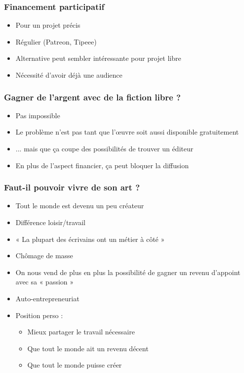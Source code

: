 \documentclass[11pt]{beamer}
\begin{document}
\begin{frame}
  \frametitle{Financement participatif}
    \begin{itemize}
    \item Pour un projet précis
    \item Régulier (Patreon, Tipeee)
    \item Alternative peut sembler intéressante pour projet libre
    \item Nécessité d'avoir déjà une audience
    \end{itemize}
\end{frame}

\begin{frame}
  \frametitle{Gagner de l'argent avec de la fiction libre ?}
    \begin{itemize}
    \item Pas impossible
    \item Le problème n'est pas tant que l'œuvre soit aussi disponible gratuitement
    \item ... mais que ça coupe des possibilités de trouver un éditeur
    \item En plus de l'aspect financier, ça peut bloquer la diffusion
  \end{itemize}
\end{frame}

\begin{frame}
  \frametitle{Faut-il pouvoir vivre de son art ?}
    \begin{itemize} 
    \item Tout le monde est devenu un peu créateur
    \item Différence loisir/travail 
    \item « La plupart des écrivains ont un métier à côté » 
    \item Chômage de masse
    \item On nous vend de plus en plus la possibilité de gagner un
      revenu d'appoint avec sa « passion »
    \item Auto-entrepreneuriat
    \item Position perso :
      \begin{itemize}
      \item Mieux partager le travail nécessaire
      \item Que tout le monde ait un revenu décent
      \item Que tout le monde puisse créer 
      \end{itemize}
  \end{itemize}
\end{frame}
\end{document}
